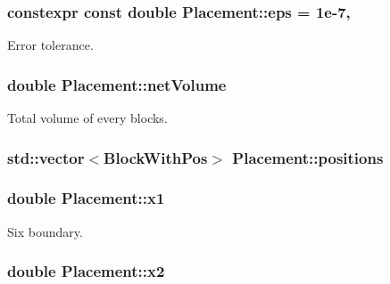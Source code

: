 \subsubsection[{eps}]{\setlength{\rightskip}{0pt plus 5cm}constexpr const double Placement\+::eps = 1e-\/7\hspace{0.3cm}{\ttfamily [static]}, {\ttfamily [private]}}\label{classPlacement_a8af99bcb7758493e48ac8270023f96d7}


Error tolerance. 

\hypertarget{classPlacement_afe51f89ddfdb2d27b68449d96f50e24d}{}
\subsubsection[{net\+Volume}]{\setlength{\rightskip}{0pt plus 5cm}double Placement\+::net\+Volume\hspace{0.3cm}{\ttfamily [private]}}\label{classPlacement_afe51f89ddfdb2d27b68449d96f50e24d}


Total volume of every blocks. 

\hypertarget{classPlacement_a5c4c9527336f2c2c18e2c6234aad8878}{}
\subsubsection[{positions}]{\setlength{\rightskip}{0pt plus 5cm}std\+::vector$<${\bf Block\+With\+Pos}$>$ Placement\+::positions\hspace{0.3cm}{\ttfamily [private]}}\label{classPlacement_a5c4c9527336f2c2c18e2c6234aad8878}
\hypertarget{classPlacement_a7061408d3dac137528697314b5825daf}{}
\subsubsection[{x1}]{\setlength{\rightskip}{0pt plus 5cm}double Placement\+::x1\hspace{0.3cm}{\ttfamily [private]}}\label{classPlacement_a7061408d3dac137528697314b5825daf}


Six boundary. 

\hypertarget{classPlacement_acb44c4ead672e30af3b6cf3758db090c}{}
\subsubsection[{x2}]{\setlength{\rightskip}{0pt plus 5cm}double Placement\+::x2\hspace{0.3cm}{\ttfamily [private]}}\label{classPlacement_acb44c4ead672e30af3b6cf3758db090c}
\hypertarget{classPlacement_a4c17ed499418886700bf8e4d4ee45047}{}
